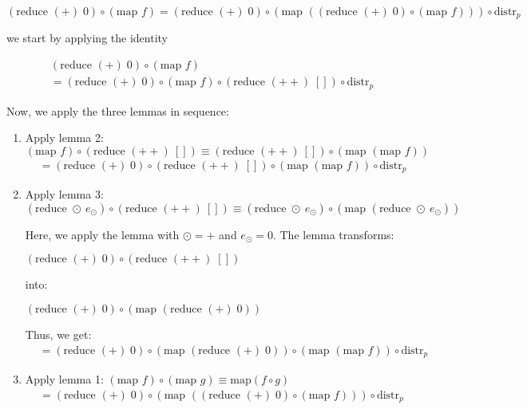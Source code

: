 \documentclass{article}
\begin{document}
$(\text{reduce } (+) \; 0) \circ (\text{map } f) = (\text{reduce } (+) \; 0) \circ (\text{map } ( (\text{reduce } (+) \; 0) \circ (\text{map } f) ) ) \circ \text{distr}_p$


we start by applying the identity

\begin{align*}
    & (\text{reduce } (+) \; 0) \circ (\text{map } f) \\
    &= (\text{reduce } (+) \; 0) \circ (\text{map } f) \circ  (\text{reduce } (++) \; []) \circ \text{distr}_p
    \end{align*}

Now, we apply the three lemmas in sequence:

\begin{enumerate}
    \item Apply lemma 2: $(\text{map } f) \circ (\text{reduce } (++)\ []) \equiv (\text{reduce } (++)\ []) \circ (\text{map } (\text{map } f))$
    \begin{align*}
    &= (\text{reduce } (+) \; 0) \circ (\text{reduce } (++) \; []) \circ (\text{map } (\text{map } f)) \circ \text{distr}_p
    \end{align*}

    \item Apply lemma 3: $(\text{reduce } \odot\ e_\odot) \circ (\text{reduce } (++)\ []) \equiv (\text{reduce } \odot\ e_\odot) \circ (\text{map } (\text{reduce } \odot\ e_\odot))$
    
    Here, we apply the lemma with $\odot = +$ and $e_\odot = 0$. The lemma transforms:
    
    $(\text{reduce } (+) \; 0) \circ (\text{reduce } (++) \; [])$
    
    into:
    
    $(\text{reduce } (+) \; 0) \circ (\text{map } (\text{reduce } (+) \; 0))$
    
    Thus, we get:
    \begin{align*}
    &= (\text{reduce } (+) \; 0) \circ (\text{map } (\text{reduce } (+) \; 0)) \circ (\text{map } (\text{map } f)) \circ \text{distr}_p
    \end{align*}

    \item Apply lemma 1: $(\text{map } f) \circ (\text{map } g) \equiv \text{map}(f \circ g)$
    \begin{align*}
    &= (\text{reduce } (+) \; 0) \circ (\text{map } ((\text{reduce } (+) \; 0) \circ (\text{map } f))) \circ \text{distr}_p
    \end{align*}
\end{enumerate}
\end{document}
